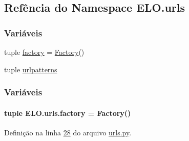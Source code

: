 \hypertarget{namespaceELO_1_1urls}{}\subsection{Refência do Namespace E\+L\+O.\+urls}
\label{namespaceELO_1_1urls}
\subsubsection*{Variáveis}
\begin{DoxyCompactItemize}
\item 
tuple \hyperlink{namespaceELO_1_1urls_a85325dfebd736ced5558533f2c4bc29a}{factory} = \hyperlink{classELO_1_1MainUnit_1_1Factory}{Factory}()
\item 
tuple \hyperlink{namespaceELO_1_1urls_a3451f093ed6ab05c006fd0d1cdba836d}{urlpatterns}
\end{DoxyCompactItemize}


\subsubsection{Variáveis}
\hypertarget{namespaceELO_1_1urls_a85325dfebd736ced5558533f2c4bc29a}{}
\paragraph[{factory}]{\setlength{\rightskip}{0pt plus 5cm}tuple E\+L\+O.\+urls.\+factory = {\bf Factory}()}\label{namespaceELO_1_1urls_a85325dfebd736ced5558533f2c4bc29a}


Definição na linha \hyperlink{urls_8py_source_l00028}{28} do arquivo \hyperlink{urls_8py_source}{urls.\+py}.

\hypertarget{namespaceELO_1_1urls_a3451f093ed6ab05c006fd0d1cdba836d}{}
